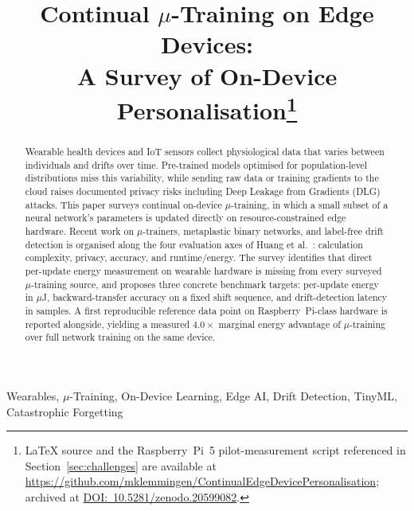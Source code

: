 \documentclass[conference]{IEEEtran}
\newcommand{\mut}{\texorpdfstring{$\mu$}{\textmu}}
\begin{document}
\title{Continual \mut-Training on Edge Devices:\\
A Survey of On-Device Personalisation\thanks{LaTeX
source and the Raspberry~Pi~5 pilot-measurement script
referenced in Section~\ref{sec:challenges} are available at
\url{https://github.com/mklemmingen/ContinualEdgeDevicePersonalisation};
archived at \href{https://doi.org/10.5281/zenodo.20599082}{DOI:~10.5281/zenodo.20599082}.}}

\author{
}

\maketitle

\begin{abstract}
Wearable health devices and IoT sensors collect physiological data
that varies between individuals and drifts over time. Pre-trained
models optimised for population-level distributions miss this
variability, while sending raw data or training gradients to the
cloud raises documented privacy risks including Deep Leakage from
Gradients (DLG) attacks. This paper surveys continual on-device
$\mu$-training, in which a small subset of a neural network's
parameters is updated directly on resource-constrained edge
hardware. Recent work on $\mu$-trainers, metaplastic binary
networks, and label-free drift detection is organised along the
four evaluation axes of Huang et al.~\cite{b1}: calculation
complexity, privacy, accuracy, and runtime/energy. The survey
identifies that direct per-update energy measurement on wearable
hardware is missing from every surveyed $\mu$-training source, and
proposes three concrete benchmark targets: per-update energy in
$\mu$J, backward-transfer accuracy on a fixed shift sequence, and
drift-detection latency in samples. A first reproducible reference
data point on Raspberry~Pi-class hardware is reported alongside,
yielding a measured $4.0{\times}$ marginal energy advantage of
$\mu$-training over full network training on the same device.
\end{abstract}

\begin{IEEEkeywords}
Wearables, $\mu$-Training, On-Device Learning, Edge AI, Drift
Detection, TinyML, Catastrophic Forgetting
\end{IEEEkeywords}
\end{document}

